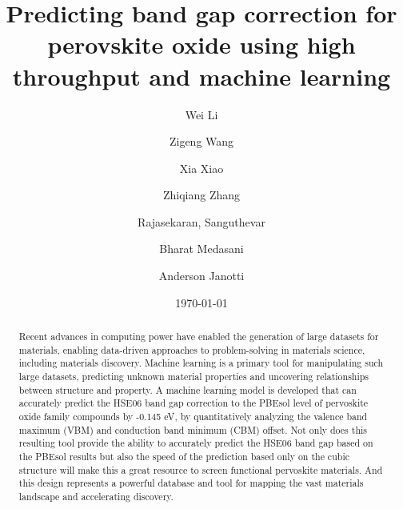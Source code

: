 \documentclass[%
twocolumn,
 amsmath,amssymb,
 aps, citeautoscript,
prb,
]{revtex4-1}
\begin{document}

\title{Predicting band gap correction for perovskite oxide using high throughput and machine learning}%

\author{Wei Li}
\author{Zigeng Wang}
\author{Xia Xiao}
\author{Zhiqiang Zhang}
\author{Rajasekaran, Sanguthevar}
\author{Bharat Medasani}
\author{Anderson Janotti}

\date{\today}%
\begin{abstract}

Recent advances in computing power have enabled the generation of large datasets for materials, enabling data-driven approaches to problem-solving in materials science, including materials discovery. Machine learning is a primary tool for manipulating such large datasets, predicting unknown material properties and uncovering relationships between structure and property. A machine learning model is developed that can accurately predict the HSE06 band gap correction to the PBEsol level of pervoskite oxide family compounds by -0.145 eV, by quantitatively analyzing the valence band maximum (VBM) and conduction band minimum (CBM) offset. Not only does this resulting tool provide the ability to accurately predict the HSE06 band gap based on the PBEsol results but also the speed of the prediction based only on the cubic structure will make this a great resource to screen functional pervoskite materials. And this design represents a powerful database and tool for mapping the vast materials landscape and accelerating discovery. 


\end{abstract}
\end{document}
